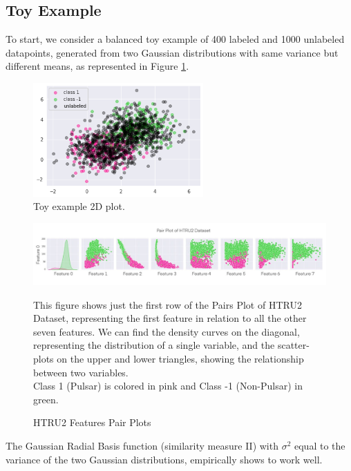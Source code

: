 \documentclass[10pt,twocolumn,letterpaper]{article}
\begin{document}
\subsection{Toy Example}
To start, we consider a balanced toy example of 400 labeled and 1000 unlabeled datapoints, generated from two Gaussian distributions with same variance but different means, as represented in Figure \ref{fig:toy_example}.\\
\renewcommand{\thefigure}{1}
\begin{figure}[htbp]
	\centering
	\includegraphics[width=6.5cm]{img/scatter_toy}
	\caption{Toy example 2D plot.}
	\label{fig:toy_example}
\end{figure}
\renewcommand{\thefigure}{3}
\begin{figure}[t]
	\centering
	\includegraphics[width=15cm]{img/sep}
	\caption{HTRU2 Features Pair Plots}
	\footnotesize{This figure shows just the first row of the Pairs Plot of HTRU2 Dataset, representing the first feature in relation to all the other seven features. We can find the density curves on the diagonal, representing the distribution of a single variable, and the scatter-plots on the upper and lower triangles, showing the relationship between two variables. \\ Class 1 (Pulsar) is colored in pink and Class -1 (Non-Pulsar) in green. }
	\label{fig:sep}
\end{figure}

The Gaussian Radial Basis function (similarity measure II) with $\sigma^2$ equal to the variance of the two Gaussian distributions, empirically shows to work well.\\
\end{document}
